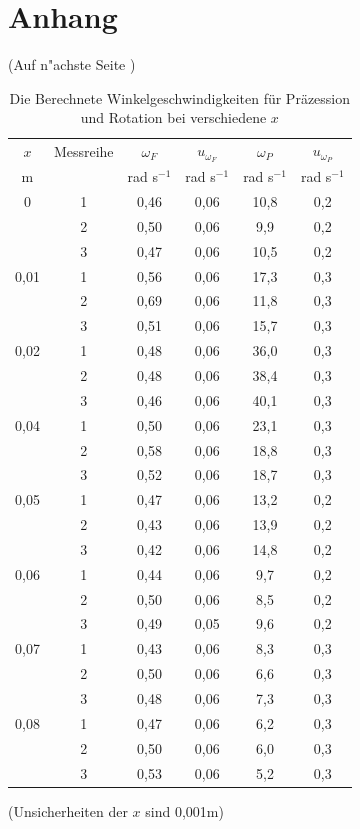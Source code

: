 \documentclass[11pt,a4paper]{article} %
\begin{document}
\section{Anhang}
(Auf n"achste Seite )
\begin{table}[h]
	\centering
	\begin{tabular*}{0.99\textwidth}{@{\extracolsep{\fill}}cccccc}
		\toprule
		$x$ & Messreihe & $\omega_F$ & $u_{\omega_F}$ & $\omega_P$ & $u_{\omega_P}$ \\
		m &  & rad s$^{-1}$ & rad s$^{-1}$ & rad s$^{-1}$& rad s$^{-1}$    \\
		\bottomrule
		0 & 1 & 0,46 & 0,06 & 10,8 & 0,2 \\
		& 2 & 0,50 & 0,06 & 9,9 & 0,2 \\
		 & 3 & 0,47 & 0,06 & 10,5 & 0,2 \\
		0,01 & 1 & 0,56 & 0,06 & 17,3 & 0,3\\
		& 2 & 0,69 & 0,06 & 11,8 & 0,3 \\
		& 3 & 0,51 & 0,06 & 15,7 & 0,3 \\
		0,02 & 1 & 0,48 & 0,06 & 36,0  &  0,3\\
		& 2 & 0,48 &0,06 & 38,4 & 0,3  \\
		& 3 & 0,46 & 0,06 & 40,1 & 0,3 \\
		0,04 & 1 & 0,50 & 0,06 & 23,1&0,3 \\
		& 2 & 0,58 &0,06&18,8&0,3 \\
		& 3 & 0,52 &0,06&18,7&0,3 \\
		0,05 & 1 & 0,47 &0,06&13,2&0,2 \\
		& 2 & 0,43&0,06&13,9&0,2 \\
		& 3 & 0,42&0,06&14,8&0,2 \\
		0,06 & 1 & 0,44 & 0,06 &9,7&0,2 \\
		& 2 & 0,50 & 0,06&8,5&0,2 \\
		& 3 & 0,49 & 0,05&9,6&0,2 \\
		0,07 & 1 & 0,43 &0,06&8,3&0,3 \\
		& 2 & 0,50&0,06&6,6&0,3 \\
		& 3 & 0,48&0,06&7,3&0,3 \\
		0,08 & 1 & 0,47 & 0,06&6,2&0,3 \\
		& 2 & 0,50 & 0,06&6,0&0,3 \\
		& 3 & 0,53&0,06&5,2&0,3 \\
		\bottomrule
	\end{tabular*}
	\caption{Die Berechnete Winkelgeschwindigkeiten für Präzession und Rotation bei verschiedene $x$}
	\label{tabelle}
	
(Unsicherheiten der $x$ sind 0,001m)
\end{table}
\end{document}
